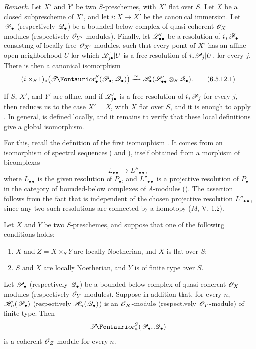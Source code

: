 \begin{env}[6.5.12]
\label{III.6.5.12}
\emph{Remark.}
Let $X'$ and $Y'$ be two $S$-preschemes, with $X'$ flat over
$S$.  Let $X$ be a closed subprescheme of $X'$, and let
$i:X\to X'$ be the canonical immersion.  Let $\mathscr{P}_\bullet$
(respectively $\mathscr{Q}_\bullet$) be a bounded-below complex of
quasi-coherent $\mathscr{O}_X$-modules (respectively
$\mathscr{O}_{Y'}$-modules).  Finally, let $\mathscr{L}'_{\bullet\bullet}$
be a resolution of $i_*\mathscr{P}_\bullet$ consisting of locally free
$\mathscr{O}_{X'}$-modules, such that every point of $X'$ has an
affine open neighborhood $U$ for which
$\mathscr{L}'_{j\bullet}|U$ is a free resolution of
$i_*\mathscr{P}_j|U$, for every $j$.  There is then a canonical
isomorphism
\[
  (i\times_S1)_*
  \bigl(\shTor_\bullet^S(\sh P_\bullet,\sh Q_\bullet)\bigr)
  \xrightarrow{\sim}
  \sh H_\bullet(\sh L'_{\bullet\bullet}\otimes_S\sh Q_\bullet).
  \tag{6.5.12.1}\label{III.6.5.12.1}
\]

If $S$, $X'$, and $Y'$ are affine, and if
$\mathscr{L}'_{j\bullet}$ is a free resolution of $i_*\mathscr{P}_j$ for
every $j$, then  reduces us to the case
$X'=X$, with $X$ flat over $S$, and it is enough to apply
.  In general,  is defined
locally, and it remains to verify that these local definitions
give a global isomorphism.

For this, recall the definition of the first isomorphism
.  It comes from an isomorphism of spectral
sequences ( and ), itself
obtained from a morphism of bicomplexes
\[
  L_{\bullet\bullet}\longrightarrow L''_{\bullet\bullet},
\]
where $L_{\bullet\bullet}$ is the given resolution of
$P_\bullet$, and
$L''_{\bullet\bullet}$ is a projective resolution of
$P_\bullet$ in the category of bounded-below complexes of
$A$-modules ().  The assertion follows from
the fact that  is independent of the chosen
projective resolution $L''_{\bullet\bullet}$, since any two such
resolutions are connected by a homotopy (\emph{M}, V, 1.2).
\end{env}

\begin{proposition}[6.5.13]
\label{III.6.5.13}
Let $X$ and $Y$ be two $S$-preschemes, and suppose that one of
the following conditions holds:
\begin{enumerate}
  \item[(i)] $X$ and $Z=X\times_SY$ are locally Noetherian, and
    $X$ is flat over $S$;
  \item[(ii)] $S$ and $X$ are locally Noetherian, and $Y$ is of
    finite type over $S$.
\end{enumerate}
Let $\mathscr{P}_\bullet$ (respectively $\mathscr{Q}_\bullet$) be a
bounded-below complex of quasi-coherent $\mathscr{O}_X$-modules
(respectively $\mathscr{O}_Y$-modules).  Suppose in addition that, for
every $n$, $\mathscr{H}_n(\mathscr{P}_\bullet)$ (respectively
$\mathscr{H}_n(\mathscr{Q}_\bullet)$) is an $\mathscr{O}_X$-module
(respectively $\mathscr{O}_Y$-module) of finite type.  Then
\[
  \shTor_n^S(\sh P_\bullet,\sh Q_\bullet)
\]
is a coherent $\mathscr{O}_Z$-module for every $n$.
\end{proposition}

